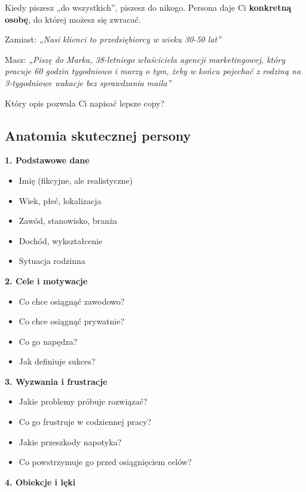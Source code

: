 \documentclass[
  12pt,
  a4paper,
  twoside,
  openright,
  12pt,
  DIV=12,
  BCOR=12mm]{scrbook}
\providecommand{\tightlist}{%
  \setlength{\itemsep}{0pt}\setlength{\parskip}{0pt}}\usepackage{longtable,booktabs,array}
\begin{document}
Kiedy piszesz „do wszystkich'', piszesz do nikogo. Persona daje Ci
\textbf{konkretną osobę}, do której możesz się zwracać.

Zamiast: \emph{„Nasi klienci to przedsiębiorcy w wieku 30-50 lat''}

Masz: \emph{„Piszę do Marka, 38-letniego właściciela agencji
marketingowej, który pracuje 60 godzin tygodniowo i marzy o tym, żeby w
końcu pojechać z rodziną na 3-tygodniowe wakacje bez sprawdzania
maila''}

Który opis pozwala Ci napisać lepsze copy?

\subsection{Anatomia skutecznej
persony}\label{anatomia-skutecznej-persony}

\textbf{1. Podstawowe dane}

\begin{itemize}
\tightlist
\item
  Imię (fikcyjne, ale realistyczne)
\item
  Wiek, płeć, lokalizacja
\item
  Zawód, stanowisko, branża
\item
  Dochód, wykształcenie
\item
  Sytuacja rodzinna
\end{itemize}

\textbf{2. Cele i motywacje}

\begin{itemize}
\tightlist
\item
  Co chce osiągnąć zawodowo?
\item
  Co chce osiągnąć prywatnie?
\item
  Co go napędza?
\item
  Jak definiuje sukces?
\end{itemize}

\textbf{3. Wyzwania i frustracje}

\begin{itemize}
\tightlist
\item
  Jakie problemy próbuje rozwiązać?
\item
  Co go frustruje w codziennej pracy?
\item
  Jakie przeszkody napotyka?
\item
  Co powstrzymuje go przed osiągnięciem celów?
\end{itemize}

\textbf{4. Obiekcje i lęki}
\end{document}
